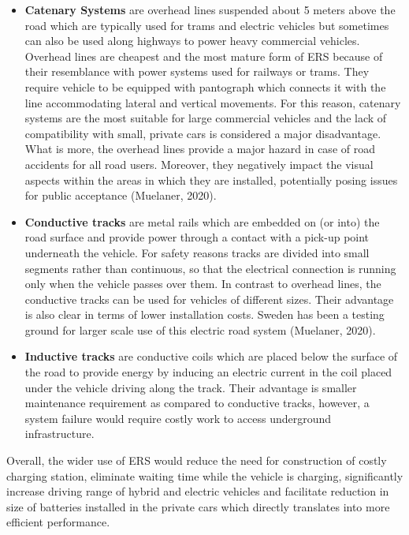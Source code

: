 \documentclass[
]{book}
\begin{document}
\begin{itemize}
\item
  \textbf{Catenary Systems} are overhead lines suspended about 5 meters above the road which are typically used for trams and electric vehicles but sometimes can also be used along highways to power heavy commercial vehicles. Overhead lines are cheapest and the most mature form of ERS because of their resemblance with power systems used for railways or trams. They require vehicle to be equipped with pantograph which connects it with the line accommodating lateral and vertical movements. For this reason, catenary systems are the most suitable for large commercial vehicles and the lack of compatibility with small, private cars is considered a major disadvantage. What is more, the overhead lines provide a major hazard in case of road accidents for all road users. Moreover, they negatively impact the visual aspects within the areas in which they are installed, potentially posing issues for public acceptance (Muelaner, 2020).
\item
  \textbf{Conductive tracks} are metal rails which are embedded on (or into) the road surface and provide power through a contact with a pick-up point underneath the vehicle. For safety reasons tracks are divided into small segments rather than continuous, so that the electrical connection is running only when the vehicle passes over them. In contrast to overhead lines, the conductive tracks can be used for vehicles of different sizes. Their advantage is also clear in terms of lower installation costs. Sweden has been a testing ground for larger scale use of this electric road system (Muelaner, 2020).
\item
  \textbf{Inductive tracks} are conductive coils which are placed below the surface of the road to provide energy by inducing an electric current in the coil placed under the vehicle driving along the track. Their advantage is smaller maintenance requirement as compared to conductive tracks, however, a system failure would require costly work to access underground infrastructure.
\end{itemize}

Overall, the wider use of ERS would reduce the need for construction of costly charging station, eliminate waiting time while the vehicle is charging, significantly increase driving range of hybrid and electric vehicles and facilitate reduction in size of batteries installed in the private cars which directly translates into more efficient performance.
\end{document}
